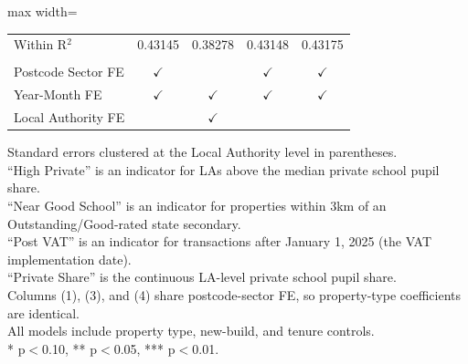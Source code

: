 \begin{table}[htbp]
\begin{adjustbox}{max width=\textwidth}
\begin{tabular}{lcccc}
      Within R$^2$                                                        & 0.43145         & 0.38278         & 0.43148            & 0.43175\\  
       \\
      Postcode Sector FE                                                   & $\checkmark$    &                 & $\checkmark$       & $\checkmark$\\
      Year-Month FE                                                       & $\checkmark$    & $\checkmark$    & $\checkmark$       & $\checkmark$\\
      Local Authority FE                                                  &                 & $\checkmark$    &                    & \\  
      \bottomrule
   \end{tabular}
   \end{adjustbox}

   \par \raggedright 
   Standard errors clustered at the Local Authority level in parentheses.\\
   ``High Private'' is an indicator for LAs above the median private school pupil share.\\
   ``Near Good School'' is an indicator for properties within 3km of an Outstanding/Good-rated state secondary.\\
   ``Post VAT'' is an indicator for transactions after January 1, 2025 (the VAT implementation date).\\
   ``Private Share'' is the continuous LA-level private school pupil share.\\
   Columns (1), (3), and (4) share postcode-sector FE, so property-type coefficients are identical.\\
   All models include property type, new-build, and tenure controls.\\
   * p$<$0.10, ** p$<$0.05, *** p$<$0.01.
\end{table}


